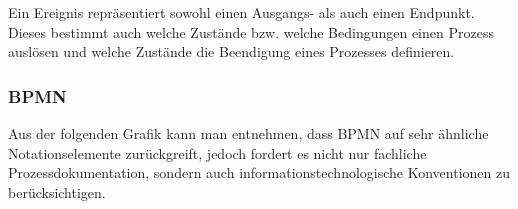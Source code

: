 \begin{figure}[H]
\begin{minipage}{\linewidth}
\begin{center}
\end{center}
\end{minipage}
\end{figure}


Ein Ereignis repräsentiert sowohl einen Ausgangs- als auch einen Endpunkt.
Dieses bestimmt auch welche Zustände bzw. welche Bedingungen einen Prozess 
auslösen und welche Zustände die Beendigung eines Prozesses definieren.

\subsubsection{BPMN}

Aus der folgenden Grafik kann man entnehmen, dass BPMN auf sehr ähnliche
Notationselemente zurückgreift, jedoch fordert es nicht nur 
fachliche Prozessdokumentation, sondern auch informationstechnologische 
Konventionen zu berücksichtigen.

\begin{figure}[H]
\begin{minipage}{\linewidth}
\begin{center}
\end{center}
\end{minipage}
\end{figure}


